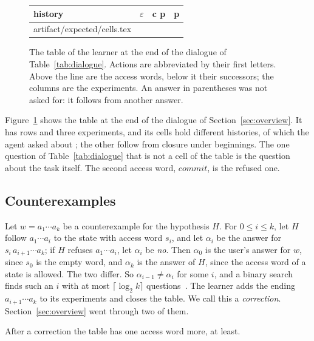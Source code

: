 \documentclass[acmsmall,nonacm,screen]{acmart}
\makeatletter
\newcommand{\nm}[1]{\mathit{#1}}
\newcommand{\commit}{\nm{commit}}
\newcommand{\claim}[2]{#2}
\newcommand{\rows}[1]{\@@input artifact/expected/#1.tex }
\makeatother
\begin{document}
\begin{figure}
\centering
\small
\begin{tabular}{lccc}
\toprule
history & $\varepsilon$ & c p & p \\
\midrule
\rows{cells}
\bottomrule
\end{tabular}
\caption{The table of the learner at the end of the dialogue of Table~\ref{tab:dialogue}.
Actions are abbreviated by their first letters. Above the line are the access words, below
it their successors; the columns are the experiments. An answer in parentheses was not asked
for: it follows from another answer.}
\label{fig:cells}
\end{figure}

Figure~\ref{fig:cells} shows the table at the end of the dialogue of
Section~\ref{sec:overview}. It has \exCellRows{} rows and three experiments, and its cells
hold \exCellWords{} different histories, of which the agent asked about \exCellsAsked{}; the
other \exCellsFree{} follow from closure under beginnings. \claim{cells}{The one question of
Table~\ref{tab:dialogue} that is not a cell of the table is the question about the task
itself.} The second access word, $\commit$, is the refused one.

\subsection{Counterexamples}

Let $w = a_1 \cdots a_k$ be a counterexample for the hypothesis $H$. For $0 \le i \le k$,
let $H$ follow $a_1 \cdots a_i$ to the state with access word $s_i$, and let $\alpha_i$ be
the answer for $s_i\, a_{i+1} \cdots a_k$; if $H$ refuses $a_1 \cdots a_i$, let $\alpha_i$ be
\emph{no}. Then $\alpha_0$ is the user's answer for $w$, since $s_0$ is the empty word, and
$\alpha_k$ is the answer of $H$, since the access word of a state is allowed. The two
differ. So $\alpha_{i-1} \neq \alpha_i$ for some $i$, and a binary search finds such an $i$
with at most $\lceil \log_2 k \rceil$ questions~\cite{rivest1993}. The learner adds the
ending $a_{i+1} \cdots a_k$ to its experiments and closes the table. We call this a
\emph{correction}. Section~\ref{sec:overview} went through two of them.

\begin{lemma}
\label{lem:progress}
After a correction the table has one access word more, at least.
\end{lemma}
\end{document}
